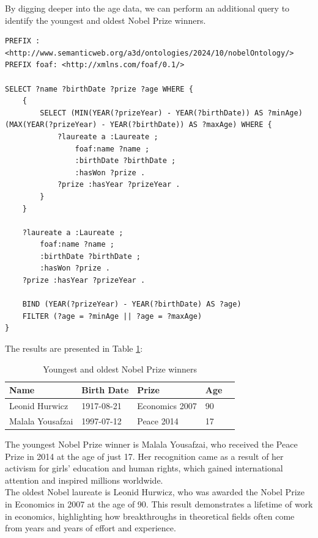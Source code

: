 \documentclass{article}
\begin{document}
\newpage

By digging deeper into the age data, we can perform an additional query to identify the youngest and oldest
Nobel Prize winners.

\begin{lstlisting}
PREFIX : <http://www.semanticweb.org/a3d/ontologies/2024/10/nobelOntology/>
PREFIX foaf: <http://xmlns.com/foaf/0.1/>

SELECT ?name ?birthDate ?prize ?age WHERE {
    {
        SELECT (MIN(YEAR(?prizeYear) - YEAR(?birthDate)) AS ?minAge)               (MAX(YEAR(?prizeYear) - YEAR(?birthDate)) AS ?maxAge) WHERE {
            ?laureate a :Laureate ;
                foaf:name ?name ;
                :birthDate ?birthDate ;
                :hasWon ?prize .
            ?prize :hasYear ?prizeYear .
        }
    }

    ?laureate a :Laureate ;
        foaf:name ?name ;
        :birthDate ?birthDate ;
        :hasWon ?prize .
    ?prize :hasYear ?prizeYear .

    BIND (YEAR(?prizeYear) - YEAR(?birthDate) AS ?age)
    FILTER (?age = ?minAge || ?age = ?maxAge)
}
\end{lstlisting}

\vspace{1em}

The results are presented in Table \ref{tab:youngest_oldest}:

\begin{table}[H]
	\centering
	\caption{Youngest and oldest Nobel Prize winners}
	\begin{tabular}{|l|l|l|l|c|}
		\hline
		\textbf{Name}    & \textbf{Birth Date} & \textbf{Prize} & \textbf{Age} \\ \hline
		Leonid Hurwicz   & 1917-08-21          & Economics 2007 & 90           \\ \hline
		Malala Yousafzai & 1997-07-12          & Peace 2014     & 17           \\ \hline
	\end{tabular}
	\label{tab:youngest_oldest}
\end{table}

The youngest Nobel Prize winner is Malala Yousafzai, who received the Peace Prize in 2014 at the age of just 17.
Her recognition came as a result of her activism for girls' education and human rights, which gained international
attention and inspired millions worldwide.\\
The oldest Nobel laureate is Leonid Hurwicz, who was awarded the Nobel Prize in Economics in 2007 at the age of 90.
This result demonstrates a lifetime of work in economics, highlighting how breakthroughs in theoretical fields
often come from years and years of effort and experience.
\end{document}
